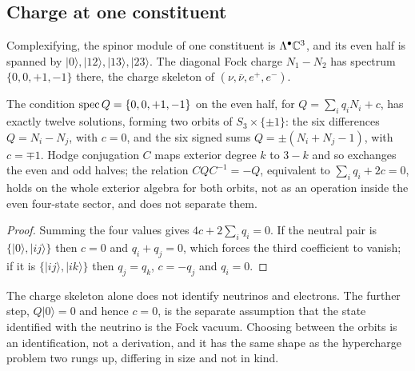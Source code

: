 \subsection{Charge at one constituent}

Complexifying, the spinor module of one constituent is $\Lambda^\bullet\mathbb{C}^3$, and its even half is spanned by
$|0\rangle,|12\rangle,|13\rangle,|23\rangle$. The diagonal Fock charge $N_1-N_2$ has spectrum $\{0,0,+1,-1\}$ there, the charge skeleton of
$(\nu,\bar\nu,e^+,e^-)$.

\begin{theorem}
\label{thm:fock}
The condition $\operatorname{spec} Q=\{0,0,+1,-1\}$ on the even half, for $Q=\sum_iq_iN_i+c$, has exactly twelve solutions, forming two orbits of
$S_3\times\{\pm1\}$: the six differences $Q=N_i-N_j$, with $c=0$, and the six signed sums $Q=\pm(N_i+N_j-1)$, with $c=\mp1$. Hodge
conjugation $C$ maps exterior degree $k$ to $3-k$ and so exchanges the even and odd halves; the relation $CQC^{-1}=-Q$, equivalent to
$\sum_iq_i+2c=0$, holds on the whole exterior algebra for both orbits, not as an operation inside the even four-state sector, and does not
separate them.
\end{theorem}

\begin{proof}
Summing the four values gives $4c+2\sum_iq_i=0$. If the neutral pair is $\{|0\rangle,|ij\rangle\}$ then $c=0$ and $q_i+q_j=0$, which forces
the third coefficient to vanish; if it is $\{|ij\rangle,|ik\rangle\}$ then $q_j=q_k$, $c=-q_j$ and $q_i=0$.
\end{proof}

The charge skeleton alone does not identify neutrinos and electrons. The further step, $Q|0\rangle=0$ and hence $c=0$, is the separate
assumption that the state identified with the neutrino is the Fock vacuum.
Choosing between the orbits is an identification, not a derivation, and it has the same shape as the hypercharge problem two rungs up,
differing in size and not in kind.


